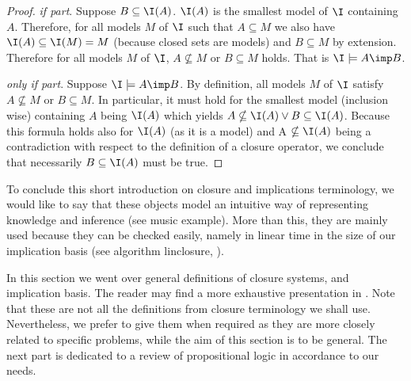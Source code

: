 \begin{proof} \textit{if part}. Suppose $B \subseteq \I(A)$. $\I(A)$ is the
smallest model of $\I$ containing $A$. Therefore, for all models $M$ of $\I$
such that $A \subseteq M$ we also have $\I(A) \subseteq \I(M) = M$ (because
closed sets are models) and $B \subseteq M$ by extension. Therefore for all
models $M$ of $\I$, $A \nsubseteq M$ or $B \subseteq M$ holds. That is 
$\I \models A \imp B$.

\vspace{1.2em}

\textit{only if part}. Suppose $\I \models A \imp B$. By definition, all models
$M$ of $\I$ satisfy $A \nsubseteq M$ or $B \subseteq M$. In particular, it must
hold for the smallest model (inclusion wise) containing $A$ being $\I(A)$ which
yields $A \nsubseteq \I(A) \lor B \subseteq \I(A)$. Because this formula holds 
also for $\I(A)$ (as it is a model) and A $\nsubseteq \I(A)$ being a 
contradiction with respect to the definition of a closure operator, we conclude 
that necessarily $B \subseteq \I(A)$ must be true.

\end{proof}


\vspace{1.2em}

To conclude this short introduction on closure and implications terminology, we 
would like to say that these objects model an intuitive way of representing
knowledge and inference (see music example). More than this, they are mainly 
used because they can be checked easily, namely in linear time in the size of
our implication basis (see algorithm linclosure,  
\cite{b._ganter_conceptual_2016, david_minimum_1980,maier_theory_1983}).

	In this section we went over general definitions of closure systems, and 
implication basis. The reader may find a more exhaustive presentation in 
\cite{b._ganter_conceptual_2016, davey_introduction_2002}. Note that these are 
not all the definitions from closure terminology we shall use. Nevertheless, we 
prefer to give them when required as they are more closely related to specific 
problems, while the aim of this section is to be general. The next part is 
dedicated to a review of propositional logic in accordance to our needs.










